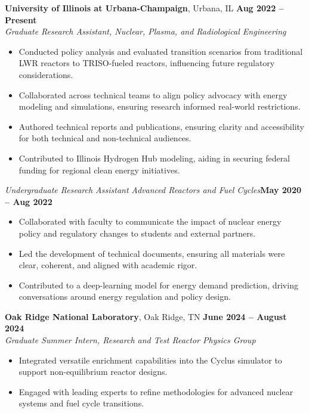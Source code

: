 \documentclass[margin,line]{resume}
\begin{document}
\begin{resume}
    \textbf{University of Illinois at Urbana-Champaign}, Urbana, IL \hfill \textbf{Aug 2022 -- Present} \\
    \textsl{Graduate Research Assistant, Nuclear, Plasma, and Radiological Engineering} \\
    \begin{itemize}
        \item Conducted policy analysis and evaluated transition scenarios from traditional LWR reactors to TRISO-fueled reactors, influencing future regulatory considerations.
        \item Collaborated across technical teams to align policy advocacy with energy modeling and simulations, ensuring research informed real-world restrictions.
        \item Authored technical reports and publications, ensuring clarity and accessibility for both technical and non-technical audiences.
        \item Contributed to Illinois Hydrogen Hub modeling, aiding in securing federal funding for regional clean energy initiatives.
    \end{itemize}

    \textsl{Undergraduate Research Assistant} \textsl{Advanced Reactors and Fuel Cycles}\hfill \textbf{May 2020 -- Aug 2022}\\
    \begin{itemize}
        \item Collaborated with faculty to communicate the impact of nuclear energy policy and regulatory changes to students and external partners.
        \item Led the development of technical documents, ensuring all materials were clear, coherent, and aligned with academic rigor.
        \item Contributed to a deep-learning model for energy demand prediction, driving conversations around energy regulation and policy design.
    \end{itemize}

    \textbf{Oak Ridge National Laboratory}, Oak Ridge, TN \hfill \textbf{June 2024 -- August 2024} \\
    \textsl{Graduate Summer Intern, Research and Test Reactor Physics Group} \\
    \begin{itemize}
        \item Integrated versatile enrichment capabilities into the Cyclus simulator to support non-equilibrium reactor designs.
        \item Engaged with leading experts to refine methodologies for advanced nuclear systems and fuel cycle transitions.
    \end{itemize}


\end{resume}
\end{document}

